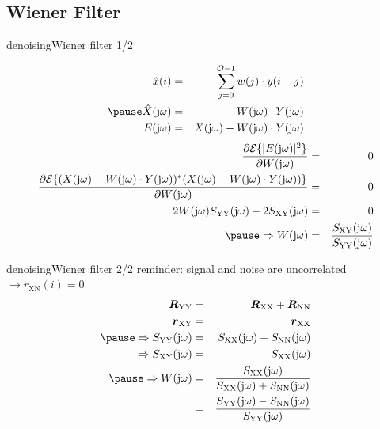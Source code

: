 \subsection{Wiener Filter}
	\begin{frame}{denoising}{Wiener filter 1/2}
        \begin{footnotesize}
        \begin{eqnarray*}
            \hat{x}(i) &=& \sum\limits_{j=0}^{\mathcal{O}-1} w(j)\cdot y(i-j)\\
            \pause
            \hat{X}(\jom) &=& W(\jom)\cdot Y(\jom)\\
            E(\jom) &=& X(\jom) - W(\jom)\cdot Y(\jom)
        \end{eqnarray*}
            \pause
            \bigskip
        \begin{eqnarray*}
            \frac{\partial \mathcal{E}\lbrace |E(\jom)|^2\rbrace}{\partial W(\jom)} &=& 0\\
            \frac{\partial \mathcal{E}\lbrace (X(\jom) - W(\jom)\cdot Y(\jom))^*(X(\jom) - W(\jom)\cdot Y(\jom))\rbrace}{\partial W(\jom)} &=& 0\\
            2W(\jom)S_\mathrm{YY}(\jom) - 2S_\mathrm{XY}(\jom) &=&0\\
            \pause
            \bigskip\Rightarrow
            W(\jom) &=& \frac{S_\mathrm{XY}(\jom)}{S_\mathrm{YY}(\jom)}
        \end{eqnarray*}
        \end{footnotesize}
 	\end{frame}

	\begin{frame}{denoising}{Wiener filter 2/2}
       reminder: signal and noise are uncorrelated $\rightarrow r_\mathrm{XN}(i) = 0$
        \begin{eqnarray*}
            \mat{R}_\mathrm{YY} &=& \mat{R}_\mathrm{XX} + \mat{R}_\mathrm{NN}\\
            \vec{r}_\mathrm{XY} &=& \vec{r}_\mathrm{XX}\\
            \bigskip
            \pause
            \Rightarrow {S}_\mathrm{YY}(\jom) &=& {S}_\mathrm{XX}(\jom) + {S}_\mathrm{NN}(\jom)\\
            \Rightarrow {S}_\mathrm{XY}(\jom) &=& {S}_\mathrm{XX}(\jom)\\
            \pause
            \bigskip
            \Rightarrow
            W(\jom) &=& \frac{S_\mathrm{XX}(\jom)}{{S}_\mathrm{XX}(\jom) + {S}_\mathrm{NN}(\jom)}\\
            \bigskip
            &=& \frac{S_\mathrm{YY}(\jom) - S_\mathrm{NN}(\jom)}{{S}_\mathrm{YY}(\jom)}
        \end{eqnarray*}
 	\end{frame}

